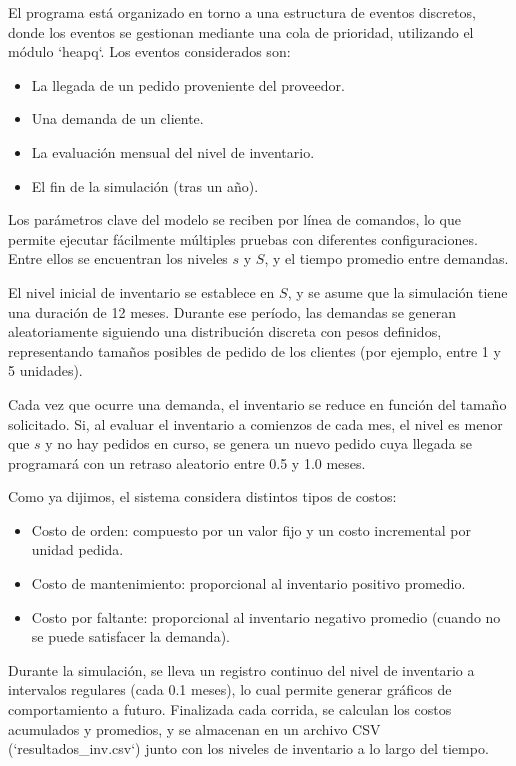 \documentclass{article}
\begin{document}
El programa está organizado en torno a una estructura de eventos discretos, donde los eventos se gestionan mediante una cola de prioridad, utilizando el módulo `heapq`. Los eventos considerados son:

\begin{itemize}
    \item La llegada de un pedido proveniente del proveedor.
    \item Una demanda de un cliente.
    \item La evaluación mensual del nivel de inventario.
    \item El fin de la simulación (tras un año).
\end{itemize} 

Los parámetros clave del modelo se reciben por línea de comandos, lo que permite ejecutar fácilmente múltiples pruebas con diferentes configuraciones. Entre ellos se encuentran los niveles \( s \) y \( S \), y el tiempo promedio entre demandas.

El nivel inicial de inventario se establece en \( S \), y se asume que la simulación tiene una duración de 12 meses. Durante ese período, las demandas se generan aleatoriamente siguiendo una distribución discreta con pesos definidos, representando tamaños posibles de pedido de los clientes (por ejemplo, entre 1 y 5 unidades).

Cada vez que ocurre una demanda, el inventario se reduce en función del tamaño solicitado. Si, al evaluar el inventario a comienzos de cada mes, el nivel es menor que \( s \) y no hay pedidos en curso, se genera un nuevo pedido cuya llegada se programará con un retraso aleatorio entre 0.5 y 1.0 meses.

Como ya dijimos, el sistema considera distintos tipos de costos:

\begin{itemize}
    \item Costo de orden: compuesto por un valor fijo y un costo incremental por unidad pedida.
    \item Costo de mantenimiento: proporcional al inventario positivo promedio.
    \item Costo por faltante: proporcional al inventario negativo promedio (cuando no se puede satisfacer la demanda).
\end{itemize}

Durante la simulación, se lleva un registro continuo del nivel de inventario a intervalos regulares (cada 0.1 meses), lo cual permite generar gráficos de comportamiento a futuro. Finalizada cada corrida, se calculan los costos acumulados y promedios, y se almacenan en un archivo CSV (`resultados_inv.csv`) junto con los niveles de inventario a lo largo del tiempo.
\end{document}
